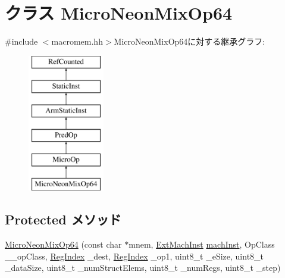 \hypertarget{classArmISA_1_1MicroNeonMixOp64}{
\section{クラス MicroNeonMixOp64}
\label{classArmISA_1_1MicroNeonMixOp64}
}


{\ttfamily \#include $<$macromem.hh$>$}MicroNeonMixOp64に対する継承グラフ:\begin{figure}[H]
\begin{center}
\leavevmode
\includegraphics[height=6cm]{classArmISA_1_1MicroNeonMixOp64}
\end{center}
\end{figure}
\subsection*{Protected メソッド}
\begin{DoxyCompactItemize}
\item 
\hyperlink{classArmISA_1_1MicroNeonMixOp64_a7e806f9d0c1e32b27ec5d124d88f99be}{MicroNeonMixOp64} (const char $\ast$mnem, \hyperlink{classStaticInst_a5605d4fc727eae9e595325c90c0ec108}{ExtMachInst} \hyperlink{classStaticInst_a744598b194ca3d4201d9414ce4cc4af4}{machInst}, OpClass \_\-\_\-opClass, \hyperlink{classStaticInst_a36d25e03e43fa3bb4c5482cbefe5e0fb}{RegIndex} \_\-dest, \hyperlink{classStaticInst_a36d25e03e43fa3bb4c5482cbefe5e0fb}{RegIndex} \_\-op1, uint8\_\-t \_\-eSize, uint8\_\-t \_\-dataSize, uint8\_\-t \_\-numStructElems, uint8\_\-t \_\-numRegs, uint8\_\-t \_\-step)
\end{DoxyCompactItemize}
